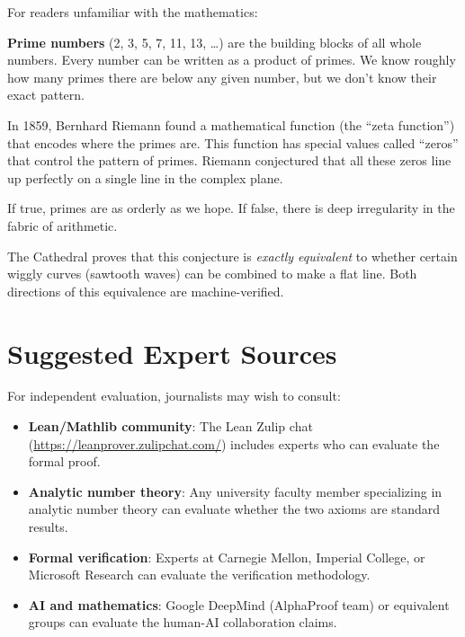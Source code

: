 \documentclass[11pt,a4paper]{article}
\begin{document}
For readers unfamiliar with the mathematics:

\textbf{Prime numbers} (2, 3, 5, 7, 11, 13, \ldots) are the
building blocks of all whole numbers. Every number can be written
as a product of primes. We know roughly how many primes there are
below any given number, but we don't know their exact pattern.

In 1859, Bernhard Riemann found a mathematical function (the
``zeta function'') that encodes where the primes are. This function
has special values called ``zeros'' that control the pattern of
primes. Riemann conjectured that all these zeros line up perfectly
on a single line in the complex plane.

If true, primes are as orderly as we hope. If false, there is
deep irregularity in the fabric of arithmetic.

The Cathedral proves that this conjecture is \emph{exactly
equivalent} to whether certain wiggly curves (sawtooth waves) can
be combined to make a flat line. Both directions of this equivalence
are machine-verified.

\section{Suggested Expert Sources}

For independent evaluation, journalists may wish to consult:

\begin{itemize}
  \item \textbf{Lean/Mathlib community}: The Lean Zulip chat
    (\url{https://leanprover.zulipchat.com/}) includes experts
    who can evaluate the formal proof.

  \item \textbf{Analytic number theory}: Any university faculty
    member specializing in analytic number theory can evaluate
    whether the two axioms are standard results.

  \item \textbf{Formal verification}: Experts at Carnegie Mellon,
    Imperial College, or Microsoft Research can evaluate the
    verification methodology.

  \item \textbf{AI and mathematics}: Google DeepMind (AlphaProof
    team) or equivalent groups can evaluate the human-AI
    collaboration claims.
\end{itemize}
\end{document}
